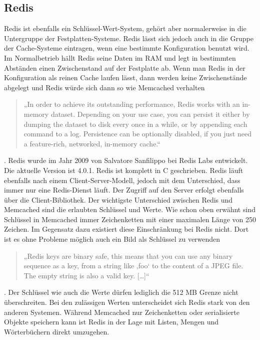 \subsection{Redis}
Redis ist ebenfalls ein Schlüssel-Wert-System, gehört aber normalerweise in die
Untergruppe der Festplatten-Systeme. Redis lässt sich jedoch auch in die Gruppe
der Cache-Systeme eintragen, wenn eine bestimmte Konfiguration benutzt wird.
Im Normalbetrieb hällt Redis seine Daten im \gls{RAM} und legt in bestimmten
Abständen einen Zwischenstand auf der Festplatte ab. Wenn man Redis in der
Konfiguration als reinen Cache laufen lässt, dann werden keine Zwischenstände
abgelegt und Redis würde sich dann so wie Memcached verhalten
\begin{quote}
    „In order to achieve its outstanding performance, Redis works with an
    in-memory dataset. Depending on your use case, you can persist it either by
    dumping the dataset to disk every once in a while, or by appending each
    command to a log. Persistence can be optionally disabled, if you just need
    a feature-rich, networked, in-memory cache.“ \cite{Redis2010}
\end{quote}
. Redis wurde im Jahr 2009 von Salvatore Sanfilippo bei Redis Labs entwickelt.
Die aktuelle Version ist 4.0.1. Redis ist komplett in C geschrieben.
Redis läuft ebenfalls nach einem Client-Server-Modell, jedoch mit dem
Unterschied, dass immer nur eine Redis-Dienst läuft. Der Zugriff auf den Server
erfolgt ebenfalls über die Client-Bibliothek. Der wichtigste Unterschied
zwischen Redis und Memcached sind die erlaubten Schlüssel und Werte. Wie schon
oben erwähnt sind Schlüssel in Memcached immer Zeichenketten mit einer
maximalen Länge von 250 Zeichen. Im Gegensatz dazu existiert diese Einschränkung
bei Redis nicht. Dort ist es ohne Probleme möglich auch ein Bild als Schlüssel
zu verwenden
\begin{quote}
    „Redis keys are binary safe, this means that you can use any binary sequence
    as a key, from a string like ‚foo‘ to the content of a JPEG file. The empty
    string is also a valid key. [\dots]“ \cite{Redis2010}
\end{quote}
. Der Schlüssel wie auch die Werte dürfen lediglich die 512 MB Grenze nicht
überschreiten. Bei den zulässigen Werten unterscheidet sich Redis stark von den
anderen Systemen. Während Memcached nur Zeichenketten oder serialisierte Objekte
speichern kann ist Redis in der Lage mit Listen, Mengen und Wörterbüchern direkt
umzugehen.
